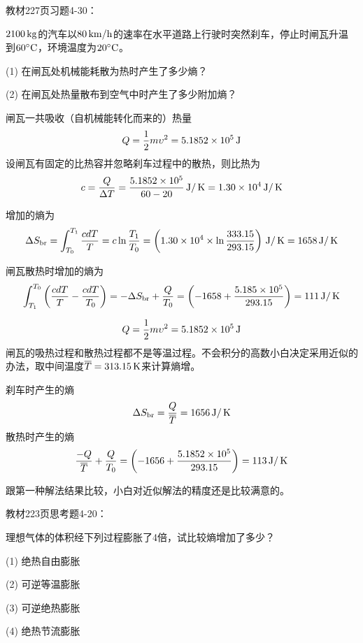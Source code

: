 \documentclass[CJK]{beamer}
\begin{document}
\begin{frame}
  \chtitle{\proid (\sthree)}
  \bch
  教材227页习题4-30：

  $2100\,\mathrm{kg}$的汽车以$80\,\mathrm{km}/\mathrm{h}$的速率在水平道路上行驶时突然刹车，停止时闸瓦升温到$60^\circ \mathrm{C}$，环境温度为$20^\circ \mathrm{C}$。
  \bitem
\item[(1)]{在闸瓦处机械能耗散为热时产生了多少熵？}
\item[(2)]{在闸瓦处热量散布到空气中时产生了多少附加熵？}
  \eitem
  \ech
\end{frame}


\begin{frame}
  \bch
  {\small
  闸瓦一共吸收（自机械能转化而来的）热量
  $$Q  = \frac{1}{2}m\upsilon^2 = 5.1852\times 10^5 \,\mathrm{J}$$
  设闸瓦有固定的比热容并忽略刹车过程中的散热，则比热为
  $$ c = \frac{Q}{\Delta T} = \frac{5.1852\times 10^5}{60-20}\,\mathrm{J}/\,\mathrm{K} = 1.30\times 10^4 \,\mathrm{J}/\,\mathrm{K}$$
  
  增加的熵为
  $$ \Delta S_{\rm br} = \int_{T_0}^{T_1} \frac{c dT}{T} = c\ln\frac{T_1}{T_0} = \left(1.30\times 10^4 \times \ln\frac{333.15}{293.15}\right) \,\mathrm{J}/\,\mathrm{K} = 1658 \,\mathrm{J}/\,\mathrm{K}$$

  闸瓦散热时增加的熵为
  $$\int_{T_1}^{T_0} \left(\frac{cdT}{T} -\frac{cdT}{T_0} \right) = -\Delta S_{\rm br} + \frac{Q}{T_0} = \left(-1658 + \frac{5.185\times 10^5}{293.15}\right) = 111 \,\mathrm{J}/\,\mathrm{K}$$
  
  }
  \ech
\end{frame}


\begin{frame}
  \bch
      {\small
        $$Q  = \frac{1}{2}m\upsilon^2 = 5.1852\times 10^5 \,\mathrm{J}$$
        闸瓦的吸热过程和散热过程都不是等温过程。不会积分的高数小白决定采用近似的办法，取中间温度$\overline{T} = 313.15\,\mathrm{K}$来计算熵增。
        
        刹车时产生的熵
        $$ \Delta S_{\rm br} = \frac{Q}{\overline{T}} = 1656 \,\mathrm{J}/\,\mathrm{K}$$
        散热时产生的熵
        $$ \frac{-Q}{\overline{T}} + \frac{Q}{T_0} =   \left(-1656 + \frac{5.1852\times 10^5}{293.15}\right) = 113 \,\mathrm{J}/\,\mathrm{K} $$

        \skipline
        
        {\scriptsize
        跟第一种解法结果比较，小白对近似解法的精度还是比较满意的。}
  }
  \ech
\end{frame}

\begin{frame}
  \chtitle{\proid (\stwo)}
  \bch
  教材223页思考题4-20：

  理想气体的体积经下列过程膨胀了4倍，试比较熵增加了多少？
  \bitem
\item[(1)]{绝热自由膨胀}
\item[(2)]{可逆等温膨胀}
\item[(3)]{可逆绝热膨胀}
\item[(4)]{绝热节流膨胀}  
  \eitem
  \ech
\end{frame}
\end{document}
